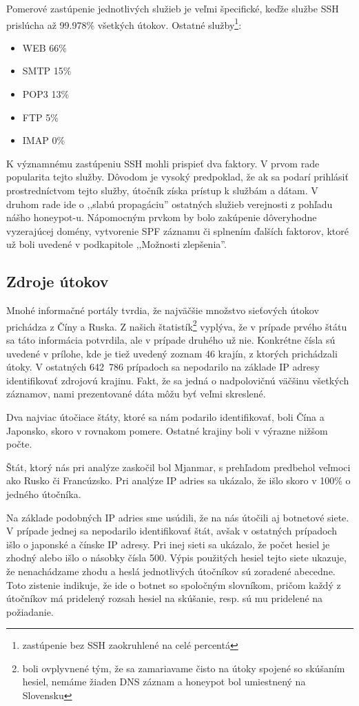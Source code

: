 \documentclass[12pt, oneside]{book}
\begin{document}
Pomerové zastúpenie jednotlivých služieb je veľmi špecifické, keďže službe SSH prislúcha až 99.978\% všetkých útokov.
Ostatné služby\footnote{zastúpenie bez SSH zaokruhlené na celé percentá}:

\begin{itemize}
\item WEB 66\%
\item SMTP 15\%
\item POP3 13\%
\item FTP 5\%
\item IMAP 0\%
\end{itemize}

K významnému zastúpeniu SSH mohli prispieť dva faktory.
V prvom rade popularita tejto služby.
Dôvodom je vysoký predpoklad, že ak sa podarí prihlásiť prostredníctvom tejto služby, útočník získa prístup k službám a dátam.
V druhom rade ide o ,,slabú propagáciu'' ostatných služieb verejnosti z pohľadu nášho honeypot-u.
Ná\-po\-moc\-ným prvkom by bolo zakúpenie dôveryhodne vyzerajúcej domény, vytvorenie SPF záznamu či splnením ďalších faktorov, ktoré už boli uvedené v podkapitole ,,Možnosti zlepšenia''.

\subsection{Zdroje útokov}

Mnohé informačné portály tvrdia, že najväčšie množstvo sieťových útokov prichádza z Číny a Ruska.
Z našich štatistík\footnote{boli ovplyvnené tým, že sa zamariavame čisto na útoky spojené so skúšaním hesiel, nemáme žiaden DNS záznam a honeypot bol umiestnený na Slovensku} vyplýva, že v prípade prvého štátu sa táto informácia potvrdila, ale v prípade druhého už nie.
Konkrétne čísla sú uvedené v prílohe, kde je tiež uvedený zoznam 46 krajín, z ktorých prichádzali útoky.
V ostatných 642~786 prípadoch sa nepodarilo na základe IP adresy identifikovať zdrojovú krajinu.
Fakt, že sa jedná o nadpolovičnú väčšinu všetkých záznamov, nami prezentované dáta môžu byť veľmi skreslené.

Dva najviac útočiace štáty, ktoré sa nám podarilo identifikovať, boli Čína a Japonsko, skoro v rovnakom pomere.
Ostatné krajiny boli v výrazne nižšom počte.

Štát, ktorý nás pri analýze zaskočil bol Mjanmar, s pre\-hľa\-dom predbehol veľmoci ako Rusko či Francúzsko.
Pri analýze IP adries sa ukázalo, že išlo skoro v 100\% o jedného útočníka.

Na základe podobných IP adries sme usúdili, že na nás útočili aj botnetové siete.
V prípade jednej sa nepodarilo identifikovať štát, avšak v ostatných prípadoch išlo o japonské a čínske IP adresy.
Pri inej sieti sa ukázalo, že počet hesiel je zhodný alebo išlo o násobky čísla 500.
Výpis použitých hesiel tejto siete ukazuje, že nenachádzame zhodu a heslá jednotlivých útočníkov sú zoradené abecedne.
Toto zistenie indikuje, že ide o botnet so spoločným slovníkom, pričom každý z útočníkov má pridelený rozsah hesiel na skúšanie, resp. sú mu pridelené na požiadanie.
\end{document}
